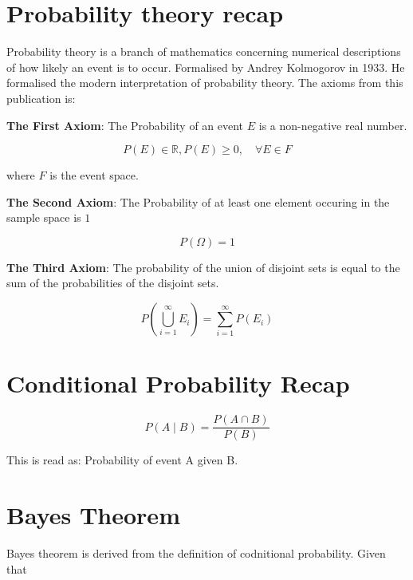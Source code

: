 \section{Probability theory recap}
Probability theory is a branch of mathematics concerning numerical descriptions
of how likely an event is to occur. Formalised by Andrey Kolmogorov in 1933.
\cite{kolmogorov1960foundations} He formalised the modern interpretation of 
probability theory. The axioms from this publication is:

\medskip

\textbf{The First Axiom}: The Probability of an event $E$ is a non-negative real
number.

\begin{equation}
    P(E) \in \mathbb{R}, P(E) \geq 0, \quad \forall E \in F 
\end{equation}

where $F$ is the event space.

\medskip

\textbf{The Second Axiom}: The Probability of at least one element occuring in
the sample space is $1$

\begin{equation}
    P(\Omega) = 1
\end{equation}

\medskip

\textbf{The Third Axiom}: The probability of the union of disjoint sets is equal
to the sum of the probabilities of the disjoint sets.

\begin{equation}
    P\left(\bigcup_{i = 1}^{\infty} E_i \right) = \sum_{i = 1}^{\infty} P(E_i)
\end{equation}

\section{Conditional Probability Recap}

\begin{equation*}
P(A \mid B) = \frac{P(A \cap  B)}{P(B)}
\end{equation*}

This is read as: Probability of event A given B. 

\section{Bayes Theorem}

Bayes theorem is derived from the definition of codnitional 
probability. Given that

